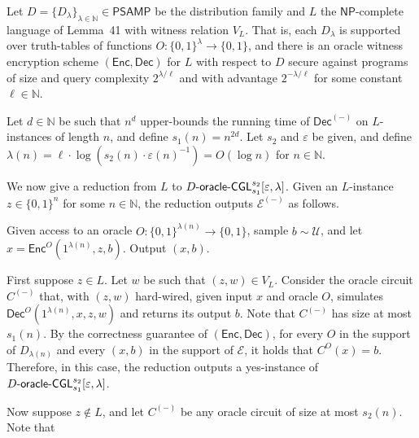 \documentclass[10pt,a4paper]{article}
\begin{document}
Let $D=\{D_{\lambda}\}_{\lambda\in\mathbb{N}}\in{\mathsf{P}}{\mathsf{SAMP}}$ be the distribution family and $L$ the ${\mathsf{NP}}$-complete language of Lemma 41 with witness relation $V_{L}$. That is, each $D_{\lambda}$ is supported over truth-tables of functions $O:\{0,1\}^{\lambda}\to\{0,1\}$, and there is an oracle witness encryption scheme $({\mathsf{Enc}},{\mathsf{Dec}})$ for $L$ with respect to $D$ secure against programs of size and query complexity $2^{\lambda/\ell}$ and with advantage $2^{-\lambda/\ell}$ for some constant $\ell\in\mathbb{N}$.\par




Let $d\in\mathbb{N}$ be such that $n^{d}$ upper-bounds the running time of ${\mathsf{Dec}}^{(-)}$ on $L$-instances of length $n$, and define $s_{1}(n)=n^{2d}$. Let $s_{2}$ and $\varepsilon$ be given, and define $\lambda(n)=\ell\cdot\log(s_{2}(n)\cdot\varepsilon(n)^{-1})=O(\log n)$ for $n\in\mathbb{N}$.\par




We now give a reduction from $L$ to $D\text{-}{\sf oracle}\text{-}{\sf CGL}^{s_{2}}_{s_{1}}[\varepsilon,\lambda]$. Given an $L$-instance $z\in\{0,1\}^{n}$ for some $n\in\mathbb{N}$, the reduction outputs $\mathcal{E}^{(-)}$ as follows.\par



Given access to an oracle $O:\{0,1\}^{\lambda(n)}\to\{0,1\}$, sample $b\sim\mathcal{U}$, and let $x={\mathsf{Enc}}^{O}(1^{\lambda(n)},z,b)$. Output $(x,b)$.\par





First suppose $z\in L$. Let $w$ be such that $(z,w)\in V_{L}$. Consider the oracle circuit $C^{(-)}$ that, with $(z,w)$ hard-wired, given input $x$ and oracle $O$, simulates ${\mathsf{Dec}}^{O}(1^{\lambda(n)},x,z,w)$ and returns its output $b$. Note that $C^{(-)}$ has size at most $s_{1}(n)$. By the correctness guarantee of $({\mathsf{Enc}},{\mathsf{Dec}})$, for every $O$ in the support of $D_{\lambda(n)}$ and every $(x,b)$ in the support of $\mathcal{E}$, it holds that $C^{O}(x)=b$. Therefore, in this case, the reduction outputs a yes-instance of $D\text{-}{\sf oracle}\text{-}{\sf CGL}^{s_{2}}_{s_{1}}[\varepsilon,\lambda]$.\par




Now suppose $z\notin L$, and let $C^{(-)}$ be any oracle circuit of size at most $s_{2}(n)$. Note that\par
\end{document}
